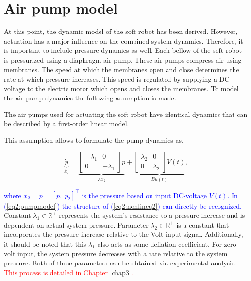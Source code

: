 \section{Air pump model}


At this point, the dynamic model of the soft robot has been derived. However, actuation has a major influence on the combined system dynamics. Therefore, it is important to include pressure dynamics as well. Each bellow of the soft robot is pressurized using a diaphragm air pump. These air pumps compress air using membranes. The speed at which the membranes open and close determines the rate at which pressure increases. This speed is regulated by supplying a DC voltage to the electric motor which opens and closes the membranes. To model the air pump dynamics the following assumption is made.

\begin{theorem}
The air pumps used for actuating the soft robot have identical dynamics that can be described by a first-order linear model.
\end{theorem}

This assumption allows to formulate the pump dynamics as,

\begin{equation}
 \underbrace{\dot{p}}_{\dot{x_2}}  = \underbrace{\begin{bmatrix} -\lambda_1 & 0 \\ 0 & -\lambda_1 \end{bmatrix} p}_{Ax_2} + \underbrace{\begin{bmatrix} \lambda_2 & 0 \\ 0 & \lambda_2 \end{bmatrix} V(t)}_{Bu(t)},
    \label{eq2:pumpmodel}
\end{equation}

\textcolor{blue}{where $x_2 = p =  [p_1 \hspace{4pt} p_2]^\top$ is the pressure based on input DC-voltage $V(t)$. In (\ref{eq2:pumpmodel}) the structure of (\ref{eq2:nonlineq2}) can directly be recognized.}  Constant $\lambda_1 \in \mathbb{R}^+$ represents the system's resistance to a pressure increase and is dependent on actual system pressure. Parameter $\lambda_2 \in \mathbb{R}^+$ is a constant that incorporates the pressure increase relative to the Volt input signal. Additionally, it should be noted that this $\lambda_1$ also acts as some deflation coefficient. For zero volt input, the system pressure decreases with a rate relative to the system pressure. Both of these parameters can be obtained via experimental analysis. \textcolor{red}{This process is detailed in Chapter \ref{chap3}.}








